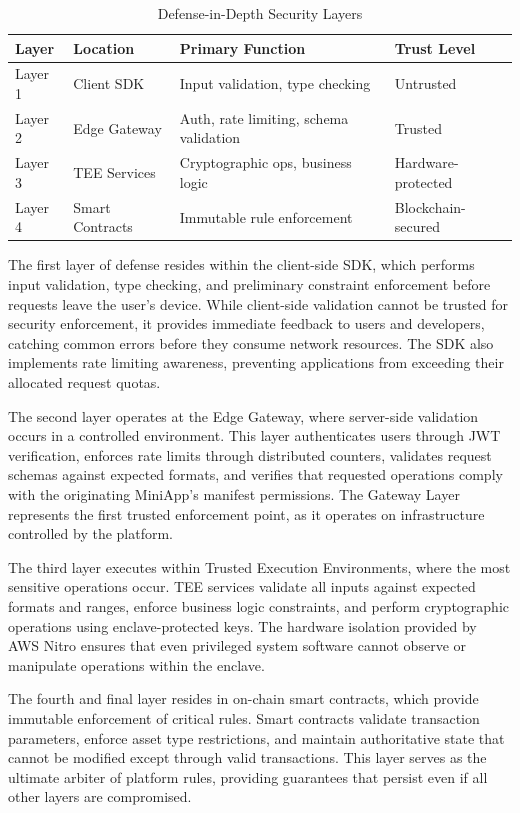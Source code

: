\documentclass[11pt,a4paper]{article}
\begin{document}
\begin{table}[h]
\centering
\caption{Defense-in-Depth Security Layers}
\begin{tabular}{@{}llll@{}}
\toprule
\textbf{Layer} & \textbf{Location} & \textbf{Primary Function} & \textbf{Trust Level} \\
\midrule
Layer 1 & Client SDK & Input validation, type checking & Untrusted \\
Layer 2 & Edge Gateway & Auth, rate limiting, schema validation & Trusted \\
Layer 3 & TEE Services & Cryptographic ops, business logic & Hardware-protected \\
Layer 4 & Smart Contracts & Immutable rule enforcement & Blockchain-secured \\
\bottomrule
\end{tabular}
\label{tab:security-layers}
\end{table}

The first layer of defense resides within the client-side SDK, which performs input validation, type checking, and preliminary constraint enforcement before requests leave the user's device. While client-side validation cannot be trusted for security enforcement, it provides immediate feedback to users and developers, catching common errors before they consume network resources. The SDK also implements rate limiting awareness, preventing applications from exceeding their allocated request quotas.

The second layer operates at the Edge Gateway, where server-side validation occurs in a controlled environment. This layer authenticates users through JWT verification, enforces rate limits through distributed counters, validates request schemas against expected formats, and verifies that requested operations comply with the originating MiniApp's manifest permissions. The Gateway Layer represents the first trusted enforcement point, as it operates on infrastructure controlled by the platform.

The third layer executes within Trusted Execution Environments, where the most sensitive operations occur. TEE services validate all inputs against expected formats and ranges, enforce business logic constraints, and perform cryptographic operations using enclave-protected keys. The hardware isolation provided by AWS Nitro ensures that even privileged system software cannot observe or manipulate operations within the enclave.

The fourth and final layer resides in on-chain smart contracts, which provide immutable enforcement of critical rules. Smart contracts validate transaction parameters, enforce asset type restrictions, and maintain authoritative state that cannot be modified except through valid transactions. This layer serves as the ultimate arbiter of platform rules, providing guarantees that persist even if all other layers are compromised.
\end{document}
